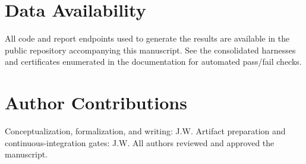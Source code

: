 \documentclass[aps,prd,twocolumn,superscriptaddress,nofootinbib,floatfix,longbibliography]{revtex4-2}
\begin{document}
\section*{Data Availability}
All code and report endpoints used to generate the results are available in the public repository accompanying this manuscript. See the consolidated harnesses and certificates enumerated in the documentation for automated pass/fail checks.
%
\section*{Author Contributions}
Conceptualization, formalization, and writing: J.W. Artifact preparation and continuous-integration gates: J.W. All authors reviewed and approved the manuscript.
%
\clearpage
\end{document}
